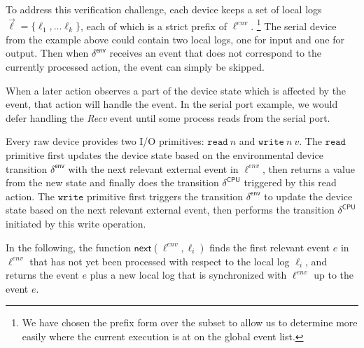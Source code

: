 
To address this verification challenge, each device keeps a set of
local logs $\vec{\ell} = \{\ell_1, ... \ell_k\}$, each of which is a strict prefix
of $\ell^{env}$.  
\footnote{We have chosen the prefix form over the subset to allow us to
determine more easily where the current execution is at on the global
event list.}
The serial device from the example above could
contain two local logs, one for input and one for output.  Then when
$\delta^{\textsf{env}}$ receives an event that does not correspond to
the currently processed action, the event can simply be skipped.
When a later action observes a part of the device state which is
affected by the event, that action will handle the event. In the
serial port example, we would defer handling the {\it \textsf{Recv}}
event until some process reads from the serial port.

Every raw device provides two I/O primitives: $\texttt{read} ~ n$ and
$\texttt{write} ~ n ~ v$. The $\texttt{read}$ primitive first updates
the device state based on the environmental device transition
$\delta^{\textsf{env}}$ with the next relevant external event in
$\ell^{env}$, then returns a value from the new state and finally
does the transition $\delta^{\textsf{CPU}}$ triggered by this read
action. The $\texttt{write}$ primitive first triggers the transition
$\delta^{\textsf{env}}$ to update the device state based on the next
relevant external event, then performs the transition
$\delta^{\textsf{CPU}}$ initiated by this write operation.

In the following, the function $\textsf{next}(\ell^{env}, \ell_i)$ finds
the first relevant event $e$ in $\ell^{env}$ that has not yet been
processed with respect to the local log $\ell_i$, and returns the event
$e$ plus a new local log that is synchronized with $\ell^{env}$ up to
the event $e$.

